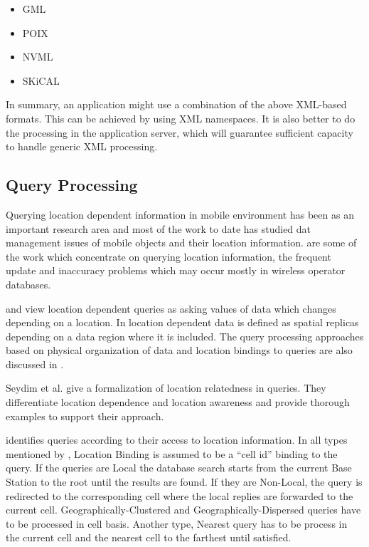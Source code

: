 \documentclass[12pt,a4paper]{article}
\begin{document}
\begin{itemize}
	\item GML \cite{gml}
	\item POIX \cite{poix}
	\item NVML \cite{nvml}
	\item SKiCAL \cite{SKICal}
\end{itemize}

In summary, an application might use a combination of the above XML-based formats. This can be achieved by using XML namespaces. It is also better to do the processing in the application server, which will guarantee sufficient capacity to handle generic XML processing.

\subsection{Query Processing} %
\label{sub:query_processing}
Querying location dependent information in mobile environment has been as an important research area and most of the work to date has studied dat management issues of mobile objects and their location information. \cite{imielinski1993data} \cite{pitoura1994building} \cite{pitoura2001locating} are some of the work which concentrate on querying location information, the frequent update and inaccuracy problems which may occur mostly in wireless operator databases.

\cite{forman1994challenges} and \cite{Dunham:1995:MCD:219713.219727} view location dependent queries as asking values of data which changes depending on a location. In \cite{Dunham:1998ci} location dependent data is defined as spatial replicas depending on a data region where it is included. The query processing approaches based on physical organization of data and location bindings to queries are also discussed in \cite{kumar1998defining}.

Seydim et al. give a formalization of location relatedness in queries. They differentiate location dependence and location awareness and provide thorough examples to support their approach. \cite{Seydim:2001wk}

\cite{xu2000querying} identifies queries according to their access to location information. In all types mentioned by \cite{xu2000querying}, Location Binding is assumed to be a ``cell id'' binding to the query. If the queries are Local the database search starts from the current Base Station to the root until the results are found. If they are Non-Local, the query is redirected to the corresponding cell where the local replies are forwarded to the current cell. Geographically-Clustered and Geographically-Dispersed queries have to be processed in cell basis. Another type, Nearest query has to be process in the current cell and the nearest cell to the farthest until satisfied.
\end{document}
